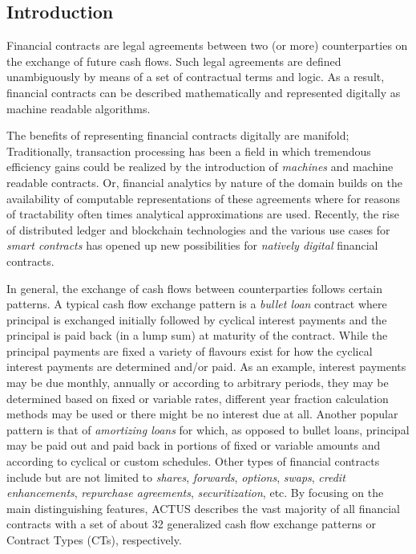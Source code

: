 \documentclass[9pt,oneside]{amsart}
\begin{document}
\begin{multicols}{2}



\section{Introduction}\label{sec:intro}

Financial contracts are legal agreements between two (or more) counterparties on the exchange of future cash flows. Such legal agreements are defined unambiguously by means of a set of contractual terms and logic. As a result, financial contracts can be described mathematically and represented digitally as machine readable algorithms.

The benefits of representing financial contracts digitally are manifold; Traditionally, transaction processing has been a field in which tremendous efficiency gains could be realized by the introduction of \textit{machines} and machine readable contracts. Or, financial analytics by nature of the domain builds on the availability of computable representations of these agreements where for reasons of tractability often times analytical approximations are used. Recently, the rise of distributed ledger and blockchain technologies and the various use cases for \textit{smart contracts} has opened up new possibilities for \textit{natively digital} financial contracts.

In general, the exchange of cash flows between counterparties follows certain patterns. A typical cash flow exchange pattern is a \textit{bullet loan} contract where principal is exchanged initially followed by cyclical interest payments and the principal is paid back (in a lump sum) at maturity of the contract. While the principal payments are fixed a variety of flavours exist for how the cyclical interest payments are determined and/or paid. As an example, interest payments may be due monthly, annually or according to arbitrary periods, they may be determined based on fixed or variable rates, different year fraction calculation methods may be used or there might be no interest due at all. Another popular pattern is that of \textit{amortizing loans} for which, as opposed to bullet loans, principal may be paid out and paid back in portions of fixed or variable amounts and according to cyclical or custom schedules. Other types of financial contracts include but are not limited to \textit{shares}, \textit{forwards}, \textit{options}, \textit{swaps}, \textit{credit enhancements}, \textit{repurchase agreements}, \textit{securitization}, etc. By focusing on the main distinguishing features, ACTUS describes the vast majority of all financial contracts with a set of about 32 generalized cash flow exchange patterns or Contract Types (CTs), respectively.


\end{multicols}
\end{document}
